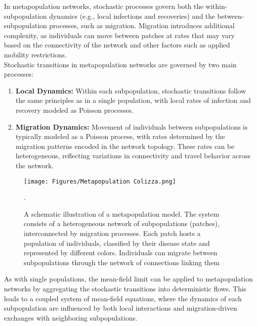 In metapopulation networks, stochastic processes govern both the within-subpopulation dynamics (e.g., local infections and recoveries) and the between-subpopulation processes, such as migration. Migration introduces additional complexity, as individuals can move between patches at rates that may vary based on the connectivity of the network and other factors such as applied mobility restrictions.\\

Stochastic transitions in metapopulation networks are governed by two main processes:


\begin{enumerate}
    \item \textbf{Local Dynamics:} Within each subpopulation, stochastic transitions follow the same principles as in a single population, with local rates of infection and recovery modeled as Poisson processes.
    \item \textbf{Migration Dynamics:} Movement of individuals between subpopulations is typically modeled as a Poisson process, with rates determined by the migration patterns encoded in the network topology. These rates can be heterogeneous, reflecting variations in connectivity and travel behavior across the network\cite{colizza2008epidemic}.
\end{enumerate}

\begin{figure}
    \centering
    \texttt{[image: Figures/Metapopulation Colizza.png]}
    \caption{\small A schematic illustration of a metapopulation model. The system consists of a heterogeneous network of subpopulations (patches), interconnected by migration processes. Each patch hosts a population of individuals, classified by their disease state and represented by different colors. Individuals can migrate between subpopulations through the network of connections linking them\cite{colizza2007reaction}}. 
\end{figure}

As with single populations, the mean-field limit can be applied to metapopulation networks by aggregating the stochastic transitions into deterministic flows. This leads to a coupled system of mean-field equations, where the dynamics of each subpopulation are influenced by both local interactions and migration-driven exchanges with neighboring subpopulations.\\

